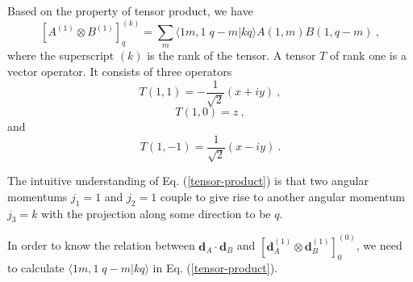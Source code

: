 Based on the property of tensor product, we have
\begin{equation}
\left[ A^{(1)} \otimes B^{(1)} \right]_{q}^{(k)} =\sum_{m} \langle 1m, 1\;q-m | kq \rangle A(1,m)B(1, q-m) \ , \label{tensor-product}
\end{equation}
where the superscript $(k)$ is the rank of the tensor. A tensor $T$ of rank one is a vector operator. It consists of three operators 
\begin{equation}
T(1,1) = - \frac{1}{\sqrt{2}} (x + i y) \ , \label{t11}
\end{equation}
\begin{equation}
T(1,0) = z \ , \label{t10}
\end{equation}
and 
\begin{equation}
T(1,-1) =  \frac{1}{\sqrt{2}} (x - i y) \ .  \label{t1-1}
\end{equation}

The intuitive understanding of Eq. (\ref{tensor-product}) is that two angular momentums $j_{1} =1$ and $j_{2}=1$ couple to give rise to another angular momentum $j_{3}=k$ with the projection along some direction to be $q$. 

In order to know the relation between $\mathbf{d}_{A}\cdot\mathbf{d}_{B}$ and $\left[ \mathbf{d}_{A}^{(1)} \otimes \mathbf{d}_{B}^{(1)} \right]_{0}^{(0)}$, we need to calculate $\langle 1m, 1\;q-m | kq \rangle$ in Eq. (\ref{tensor-product}).

